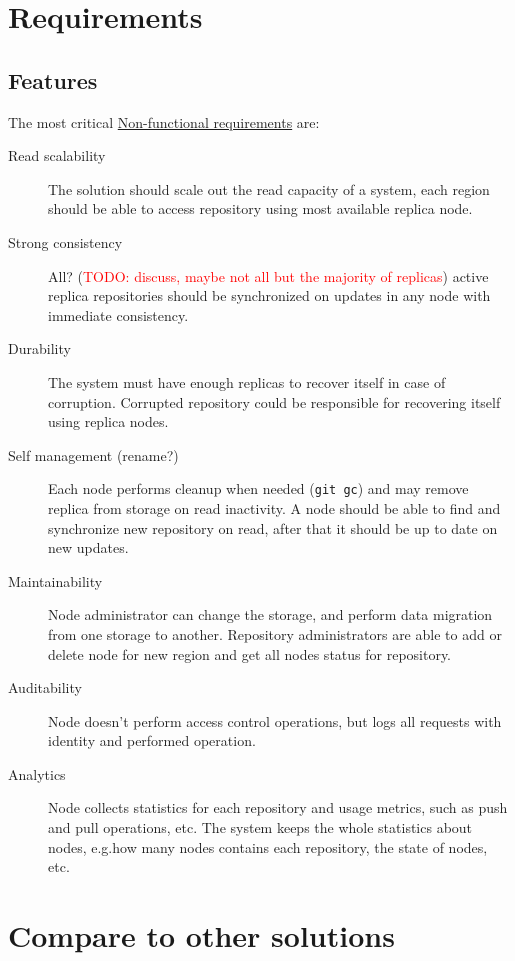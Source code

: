 \documentclass[acmlarge, screen, nonacm, 11pt]{acmart}
\newcommand{\code}[1]{\texttt{#1}}
\newcommand{\todo}[1]{\textcolor{red}{TODO: #1}}
\begin{document}
\section{Requirements}
\label{sec:requirements}

\subsection{Features}
\label{sec:features}

The most critical
\href{https://en.wikipedia.org/wiki/Non-functional_requirement}{Non-functional requirements}
are:

\begin{description}
  \item[Read scalability]
    The solution should scale out the read capacity of a system, each region should be able
    to access repository using most available replica node.
  \item[Strong consistency]
    All? (\todo{discuss, maybe not all but the majority of replicas})
    active replica repositories should be synchronized on updates in any node
    with immediate consistency.
  \item[Durability]
    The system must have enough replicas to recover itself in case of corruption.
    Corrupted repository could be responsible for recovering itself using replica nodes.
  \item[Self management (rename?)]
    Each node performs cleanup when needed (\code{git gc}) and may remove replica
    from storage on read inactivity.
    A node should be able to find and synchronize new repository on read,
    after that it should be up to date on new updates.
  \item[Maintainability]
    Node administrator can change the storage, and perform data migration from one storage
    to another.
    Repository administrators are able to add or delete node for new region and
    get all nodes status for repository.
  \item[Auditability]
    Node doesn't perform access control operations, but logs all
    requests with identity and performed operation.
  \item[Analytics]
    Node collects statistics for each repository and usage metrics, such as
    push and pull operations, etc. The system keeps the whole statistics about
    nodes, e.g.\@ how many nodes contains each repository, the state of nodes, etc.
\end{description}

\section{Compare to other solutions}
\end{document}
